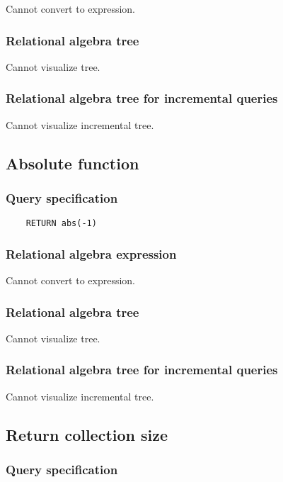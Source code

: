 	Cannot convert to expression.

	\subsubsection*{Relational algebra tree}

	Cannot visualize tree.

	\subsubsection*{Relational algebra tree for incremental queries}

	Cannot visualize incremental tree.
	\subsection{Absolute function}

	\subsubsection*{Query specification}

	\begin{lstlisting}
	RETURN abs(-1)
	\end{lstlisting}


	\subsubsection*{Relational algebra expression}

	Cannot convert to expression.

	\subsubsection*{Relational algebra tree}

	Cannot visualize tree.

	\subsubsection*{Relational algebra tree for incremental queries}

	Cannot visualize incremental tree.
	\subsection{Return collection size}

	\subsubsection*{Query specification}

